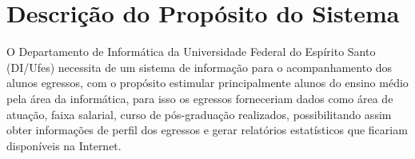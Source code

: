 \chapter{Descrição do Propósito do Sistema}
\label{sec-proposito}


O Departamento de Informática da Universidade Federal do Espírito Santo (DI/Ufes) necessita de um sistema de informação para o acompanhamento dos alunos egressos, com o propósito estimular principalmente alunos do ensino médio pela área da informática, para isso os egressos forneceriam dados como área de atuação, faixa salarial, curso de pós-graduação realizados, possibilitando assim obter informações de perfil dos egressos e gerar relatórios estatísticos que ficariam disponíveis na Internet. 
